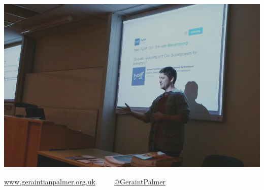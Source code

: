 \documentclass{beamer}
\begin{document}
\begin{frame}
\begin{columns}
\begin{column}{0.5\textwidth}
\begin{center}
\begin{center}
        \end{center}
        \vspace{7mm}
      \end{center}
    \end{column}
  \end{columns}
\end{frame}

\begin{frame}
\begin{center}
\includegraphics[width=\textwidth]{swordspydiff}
\end{center}
\textcolor{darkorange}{\url{www.geraintianpalmer.org.uk} $\quad \quad$ \href{https://twitter.com/GeraintPalmer}{@GeraintPalmer}}
\end{frame}
\end{document}
